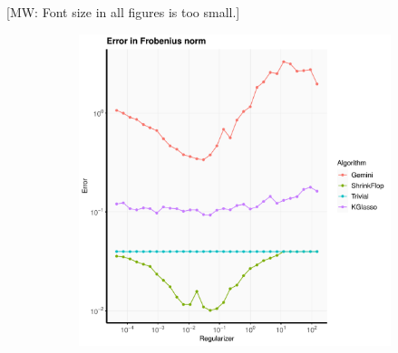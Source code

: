 \documentclass[aos]{imsart}
\theoremstyle{definition}
\numberwithin{equation}{section}
\newcommand{\CF}[1]{{\color{purple}[CF: #1]}}
\newcommand{\MW}[1]{{\color{red}[MW: #1]}}
\newcommand{\CF}[1]{{}}
\newcommand{\MW}[1]{{}}
\begin{document}

\MW{Font size in all figures is too small.}

\begin{figure}
         \centering
          \begin{subfigure}[b]{.4\textwidth}
         \includegraphics[width=\textwidth]{./code/zhou-comparison/25-50-spiked-frob.pdf}
         \end{subfigure}
          \begin{subfigure}[b]{.4\textwidth}

\end{subfigure}
\end{figure}
\end{document}
